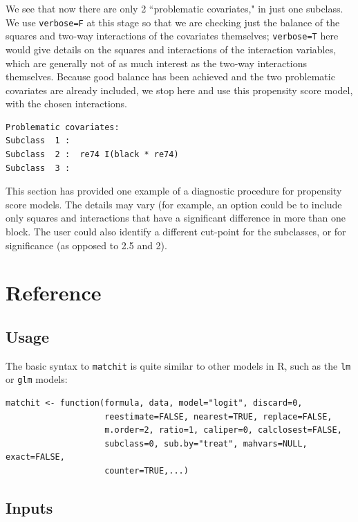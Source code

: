 \documentclass[oneside,letterpaper,titlepage]{article}
\begin{document}
We see that now there are only 2 ``problematic covariates," in just
one subclass.  We use {\tt verbose=F} at this stage so that
we are checking just the balance of the squares and two-way
interactions of the covariates themselves; {\tt verbose=T} here would
give details on the squares and interactions of the interaction
variables, which are generally not of as much interest as the two-way
interactions themselves.  Because good balance has been achieved and the two problematic covariates
are already included, we stop here and use this propensity
score model, with the chosen interactions.

\begin{verbatim}
Problematic covariates:
Subclass  1 :  
Subclass  2 :  re74 I(black * re74)
Subclass  3 :  
\end{verbatim}

This section has provided one example of a diagnostic procedure for
propensity score models.  The details may vary (for example, an option
could be to include only squares and interactions that have a
significant difference in more than one block.  The user could also
identify a different cut-point for the subclasses, or for significance
(as opposed to 2.5 and 2).

\section{Reference}

\subsection{Usage}

The basic syntax to \texttt{matchit} is quite similar to other models in R, such as the
\texttt{lm} or \texttt{glm} models: 

\begin{verbatim}
matchit <- function(formula, data, model="logit", discard=0,
                    reestimate=FALSE, nearest=TRUE, replace=FALSE,
                    m.order=2, ratio=1, caliper=0, calclosest=FALSE,
                    subclass=0, sub.by="treat", mahvars=NULL, exact=FALSE,
                    counter=TRUE,...)
\end{verbatim}

\subsection{Inputs}
\end{document}

